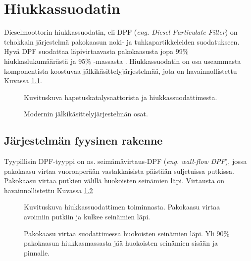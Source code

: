 \chapter{Hiukkassuodatin}%
\label{ch:dpf}



Dieselmoottorin hiukkassuodatin, eli DPF (\emph{eng. Diesel Particulate Filter}) on tehokkain järjestelmä pakokaasun noki- ja tuhkapartikkeleiden suodatukseen. 
Hyvä DPF suodattaa läpivirtaavasta pakokaasusta jopa 99\% hiukkaslukumäärästä ja 95\% -massasta \cite{Yan_state_of_the_art}. Hiukkassuodatin on osa useammasta komponentista koostuvaa jälkikäsittelyjärjestelmää, jota on havainnollistettu Kuvassa \ref{fig:EAT_full}. %

\begin{figure}[H]
    \centering
                {Kuvituskuva hapetuskatalysaattorista ja hiukkassuodattimesta.}
    \caption{Modernin jälkikäsittelyjärjestelmän osat.}
    \label{fig:EAT_full}
\end{figure}



\section{Järjestelmän fyysinen rakenne}

Tyypillisin DPF-tyyppi on ns. seimämävirtaus-DPF (\emph{eng. wall-flow DPF}), jossa pakokaasu virtaa vuoronperään vastakkaisista päistään suljetuissa putkissa. Pakokaasu virtaa putkien välillä huokoisten seinämien läpi. Virtausta on havainnollistettu Kuvassa \ref{fig:wall-flow-dpf}  


\begin{figure}[H]
    \centering 
               {Kuvituskuva hiukkassuodattimen toiminnasta. Pakokaasu virtaa avoimiin putkiin ja kulkee seinämien läpi.}
    \caption{Pakokaasu virtaa suodattimessa huokoisten seinämien läpi. Yli 90\% pakokaasun hiukkasmassasta jää huokoisten seinämien sisään ja pinnalle.}
    \label{fig:wall-flow-dpf}
\end{figure}



